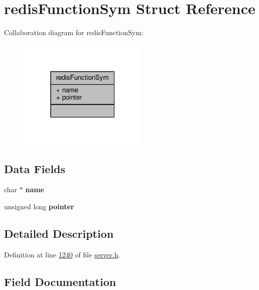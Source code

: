 \hypertarget{structredisFunctionSym}{}\section{redis\+Function\+Sym Struct Reference}
\label{structredisFunctionSym}


Collaboration diagram for redis\+Function\+Sym\+:\nopagebreak
\begin{figure}[H]
\begin{center}
\leavevmode
\includegraphics[width=175pt]{structredisFunctionSym__coll__graph}
\end{center}
\end{figure}
\subsection*{Data Fields}
\begin{DoxyCompactItemize}
\item 
\mbox{\label{structredisFunctionSym_a7b22fce09924b6ba25bd19824f134c9e}} 
char $\ast$ {\bfseries name}
\item 
\mbox{\label{structredisFunctionSym_a7f337baf5919325bf21f254459117758}} 
unsigned long {\bfseries pointer}
\end{DoxyCompactItemize}


\subsection{Detailed Description}


Definition at line \hyperlink{server_8h_source_l01240}{1240} of file \hyperlink{server_8h_source}{server.\+h}.



\subsection{Field Documentation}
\mbox{\label{structredisFunctionSym_a7b22fce09924b6ba25bd19824f134c9e}} 
